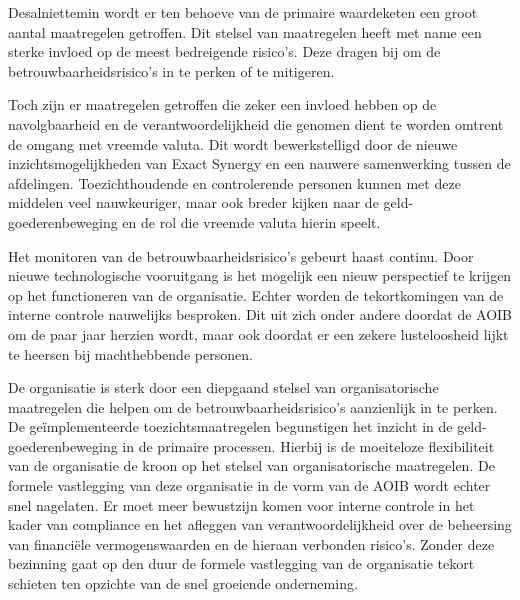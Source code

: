 Desalniettemin wordt er ten behoeve van de primaire waardeketen een groot aantal maatregelen getroffen. Dit stelsel van maatregelen heeft met name een sterke invloed op de meest bedreigende risico's. Deze dragen bij om de betrouwbaarheidsrisico’s in te perken of te mitigeren. 

Toch zijn er maatregelen getroffen die zeker een invloed hebben op de navolgbaarheid en de verantwoordelijkheid die genomen dient te worden omtrent de omgang met vreemde valuta. Dit wordt bewerkstelligd door de nieuwe inzichtsmogelijkheden van Exact Synergy en een nauwere samenwerking tussen de afdelingen. Toezichthoudende en controlerende personen kunnen met deze middelen veel nauwkeuriger, maar ook breder kijken naar de geld-goederenbeweging en de rol die vreemde valuta hierin speelt. 

Het monitoren van de betrouwbaarheidsrisico's gebeurt haast continu. Door nieuwe technologische vooruitgang is het mogelijk een nieuw perspectief te krijgen op het functioneren van de organisatie. Echter worden de tekortkomingen van de interne controle nauwelijks besproken. Dit uit zich onder andere doordat de AOIB om de paar jaar herzien wordt, maar ook doordat er een zekere lusteloosheid lijkt te heersen bij machthebbende personen.

\medskip

De organisatie is sterk door een diepgaand stelsel van organisatorische maatregelen die helpen om de betrouwbaarheidsrisico's aanzienlijk in te perken. De geïmplementeerde toezichtsmaatregelen begunstigen het inzicht in de geld-goederenbeweging in de primaire processen. Hierbij is de moeiteloze flexibiliteit van de organisatie de kroon op het stelsel van organisatorische maatregelen. De formele vastlegging van deze organisatie in de vorm van de AOIB wordt echter snel nagelaten. Er moet meer bewustzijn komen voor interne controle in het kader van compliance en het afleggen van verantwoordelijkheid over de beheersing van financiële vermogenswaarden en de hieraan verbonden risico's. Zonder deze bezinning gaat op den duur de formele vastlegging van de organisatie tekort schieten ten opzichte van de snel groeiende onderneming.






\begin{comment}
\begin{center}
  \makebox[\textwidth]{\texttt{[image: img156]}}
\end{center}

\begin{center}
  \makebox[\textwidth]{\texttt{[image: scn250]}}
\end{center}

\begin{center}
  \makebox[\textwidth]{\texttt{[image: img052]}}
\end{center}
\end{comment}